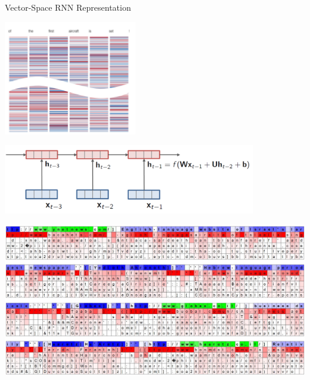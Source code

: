 \documentclass{beamer}
\newcommand{\Cite}[1]{{\footnotesize \citep{#1}}}
\begin{document}
\begin{frame}
  \centerline{Vector-Space RNN Representation}
  \begin{center}
    \includegraphics[height=5cm]{lstmrep}
  \begin{center}
    \includegraphics[width=11cm]{rnn}
  \end{center}


  \end{center}
\end{frame}


\begin{frame}
  \begin{center}
    \includegraphics[width=\textwidth]{lstm1}

     \Cite{karpathy2015visualizing}
  \end{center}
\end{frame}
\end{document}
